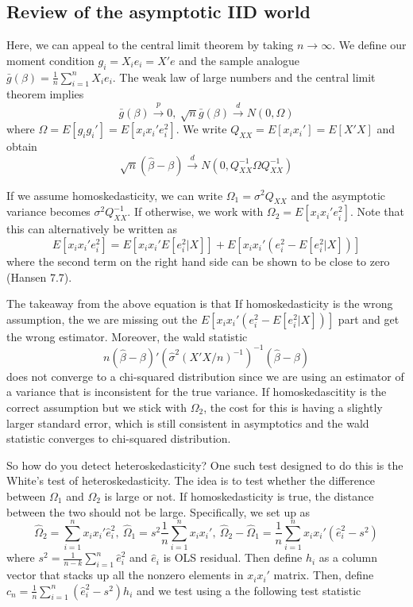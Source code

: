\documentclass[12pt]{article}
\theoremstyle{definition}
\theoremstyle{property}
\theoremstyle{assumption}
\theoremstyle{example}
\theoremstyle{comment}
\begin{document}
\subsection{Review of the asymptotic IID world}
Here, we can appeal to the central limit theorem by taking $n\to\infty$. We define our moment condition $g_i = X_ie_i = X'e$ and the sample analogue $\bar{g}(\beta)=\frac{1}{n}\sum_{i=1}^n X_ie_i$. The weak law of large numbers and the central limit theorem implies
\[
\bar{g}(\beta)\xrightarrow{p} 0,  \ \sqrt{n}\bar{g}(\beta)\xrightarrow{d}N(0,\Omega)
\]
where $\Omega=E[g_ig_i']=E[x_ix_i'e_i^2]$. We write $Q_{XX}=E[x_ix_i']=E[X'X]$ and obtain
\[
\sqrt{n}(\hat{\beta}-\beta)\xrightarrow{d}N(0,Q_{XX}^{-1}\Omega Q_{XX}^{-1})
\]
\par
If we assume homoskedasticity, we can write $\Omega_1=\sigma^2 Q_{XX}$ and the asymptotic variance becomes $\sigma^2 Q_{XX}^{-1}$. If otherwise, we work with $\Omega_2 = E[x_ix_i'e_i^2]$. Note that this can alternatively be written as
\[
E[x_ix_i'e_i^2]=E[x_ix_i'E[e_i^2|X]]+E[x_ix_i'(e_i^2 -E[e_i^2|X])]
\]
where the second term on the right hand side can be shown to be close to zero (Hansen 7.7).
\par
The takeaway from the above equation is that If homoskedasticity is the wrong assumption, the we are missing out the $E[x_ix_i'(e_i^2 -E[e_i^2|X])]$ part and get the wrong estimator. Moreover, the wald statistic
\[
n(\hat{\beta}-\beta)'(\hat{\sigma}^2(X'X/n)^{-1})^{-1}(\hat{\beta}-\beta)
\]
does not converge to a chi-squared distribution since we are using an estimator of a variance that is inconsistent for the true variance. If homoskedascitity is the correct assumption but we stick with $\Omega_2$, the cost for this is having a slightly larger standard error, which is still consistent in asymptotics and the wald statistic converges to chi-squared distribution. 
\par
So how do you detect heteroskedasticity? One such test designed to do this is the White's test of heteroskedasticity. The idea is to test whether the difference between $\Omega_1$ and $\Omega_2$ is large or not. If homoskedasticity is true, the distance between the two should not be large. Specifically, we set up as
\[
\widehat{\Omega}_2 = \sum_{i=1}^n x_ix_i'\hat{e}_i^2, \ \widehat{\Omega}_1 = s^2\frac{1}{n}\sum_{i=1}^nx_ix_i', \ \widehat{\Omega}_2-\widehat{\Omega}_1= \frac{1}{n}\sum_{i=1}^nx_ix_i'(\hat{e}_i^2-s^2)
\]
where $s^2= \frac{1}{n-k}\sum_{i=1}^n\hat{e}_i^2 $ and $\hat{e}_i$ is OLS residual. Then define $h_i$ as a column vector that stacks up all the nonzero elements in $x_ix_i'$ matrix. Then, define $c_n=\frac{1}{n}\sum_{i=1}^n(\hat{e}_i^2-s^2)h_i$ and we test using a the following test statistic
\end{document}
